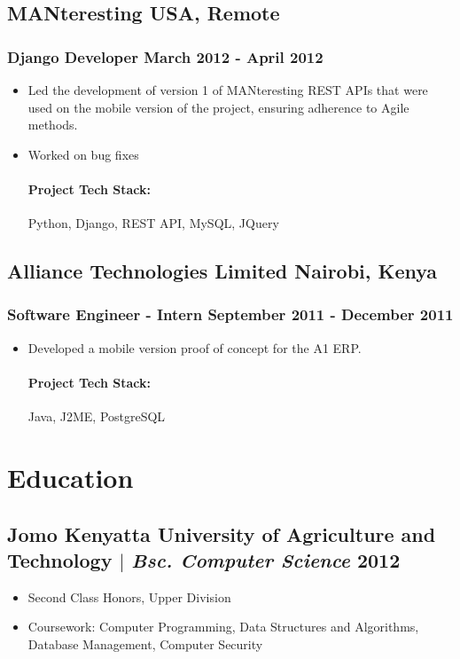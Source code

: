\documentclass[11pt]{article} %
\begin{document}
\subsection{MANteresting \hfill USA, Remote}
\subsubsection{Django Developer \hfill  March 2012 - April 2012}
\begin{itemize}
    \item Led the development of version 1 of MANteresting REST APIs that were used on the mobile version of the project, ensuring adherence to Agile methods.
    \item Worked on bug fixes
    \paragraph{Project Tech Stack:} Python, Django, REST API, MySQL, JQuery
\end{itemize}

\subsection{Alliance Technologies Limited \hfill Nairobi, Kenya}
\subsubsection{Software Engineer - Intern \hfill  September 2011 - December 2011}
\begin{itemize}
    \item Developed a mobile version proof of concept for the A1 ERP. 
    \paragraph{Project Tech Stack:} Java, J2ME, PostgreSQL
\end{itemize}

\section{Education}
\subsection{Jomo Kenyatta University of Agriculture and Technology $|$ {\normalfont\itshape Bsc. Computer Science} \hfill 2012}
\begin{itemize}
    \item Second Class Honors, Upper Division
    \item Coursework: Computer Programming, Data Structures and Algorithms, Database Management, Computer Security
\end{itemize}
\end{document}
